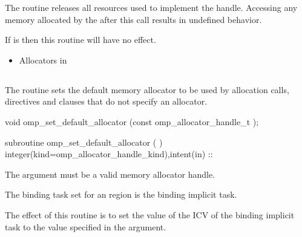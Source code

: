 \effect

The  routine releases all resources used to implement the  handle. Accessing any memory allocated by the  after this call results in undefined behavior.

If  is  then this routine will have no effect.
 
\crossreferences
\begin{itemize}
\item Allocators in 
\end{itemize}


\subsection{}
\label{subsec:omp_set_default_allocator}

\summary
The  routine sets the default memory allocator to be used by allocation calls,  directives and  clauses that do not specify an allocator.

\format
\begin{ccppspecific}
\begin{ompcFunction}
void omp_set_default_allocator (const omp_allocator_handle_t );
\end{ompcFunction}
\end{ccppspecific}
\begin{fortranspecific}
\begin{ompfSubroutine}
subroutine omp_set_default_allocator (  )
integer(kind=omp_allocator_handle_kind),intent(in) :: 
\end{ompfSubroutine}
\end{fortranspecific}

\constraints

The  argument must be a valid memory allocator handle.

\binding
The binding task set for an  region is the binding implicit task.

\effect

The effect of this routine is to set the value of the  ICV of the binding implicit task to the value specified in the  argument.

